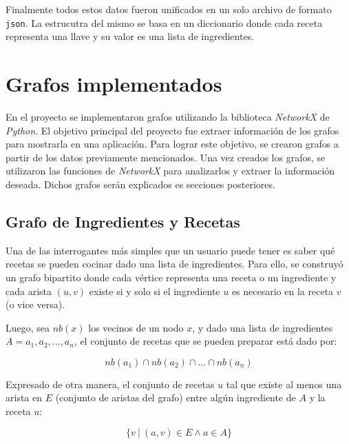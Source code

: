 \documentclass[a4paper]{article}
\begin{document}
Finalmente todos estos datos fueron unificados en un solo archivo de formato
\texttt{json}. La estrucutra del mismo se basa en un diccionario donde cada
receta representa una llave y su valor es una lista de ingredientes.


\section{Grafos implementados}\label{sec:graphs}

En el proyecto se implementaron grafos utilizando la biblioteca \emph{NetworkX}
de \emph{Python}. El objetivo principal del proyecto fue extraer información de
los grafos para mostrarla en una aplicación. Para lograr este objetivo, se
crearon grafos a partir de los datos previamente mencionados. Una vez creados
los grafos, se utilizaron las funciones de \emph{NetworkX} para analizarlos y
extraer la información deseada. Dichos grafos serán explicados es secciones
posteriores.

\subsection{Grafo de Ingredientes y Recetas}\label{sub:ing-recip-graph}

Una de las interrogantes más simples que un usuario puede tener es saber
qué recetas se pueden cocinar dado una lista de ingredientes. Para ello,
se construyó un grafo bipartito donde cada vértice representa una receta
o un ingrediente y cada arista $(u, v)$ existe si y solo si el ingrediente
$u$ es necesario en la receta $v$ (o vice versa).

Luego, sea $nb(x)$ los vecinos de un nodo $x$, y dado una lista de ingredientes
$A = a_1, a_2, ..., a_n$, el conjunto de recetas que se pueden preparar está dado
por:

$$ nb(a_1) \cap nb(a_2) \cap ... \cap nb(a_n)$$

Expresado de otra manera, el conjunto de recetas $u$ tal que existe al menos
una arista en $E$ (conjunto de aristas del grafo) entre algún ingrediente de
$A$ y la receta $u$:

$$ \{v ~|~ (a, v) \in E \wedge a \in A \} $$

\end{document}
